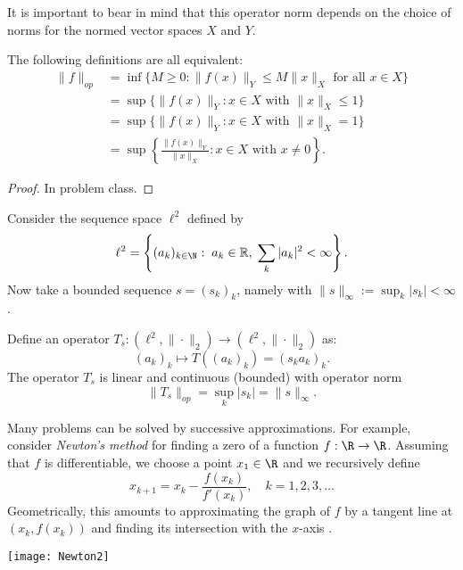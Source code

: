 \begin{remark}
 It is important to bear in mind that this operator norm depends on the choice of norms for the normed vector spaces $X$ and $Y$.
\end{remark}

\begin{proposition}
The following definitions are all equivalent:
$$
{\begin{aligned}\|f\|_{{op}}&=\inf\{M\geq 0:\|f(x)\|_Y\leq M\|x\|_X{\mbox{ for all }}x\in X\}\\
&=\sup\{\|f(x)\|_Y: x\in X{\textrm{ with }}\|x\|_X\leq 1\}\\
&=\sup\{\|f(x)\|_Y: x\in X{\mbox{ with }}\|x\|_X=1\}\\
&=\sup \left\{{\frac  {\|f(x)\|_Y}{\|x\|_X}}: x\in X{\mbox{ with }}x\neq 0\right\}.
\end{aligned}}
$$
\end{proposition}
\begin{proof} In problem class.
\end{proof}
\np

\begin{example}
Consider the sequence space $\ell^2$ defined by
$$
\ell^2 = \left\{ (a_k)_{k \in \N}: \; a_k \in \mathbb{R}, \; \sum_k |a_k|^2 < \infty \right\}.
$$
Now take a bounded sequence $s = (s_k)_k$, namely with $\|s\|_\infty:=\sup _k |s_k|<\infty$. 

Define an operator $T_s: (\ell^2,\|\cdot\|_2) \to (\ell^2, \|\cdot\|_2)$ as:
$$
(a_k)_k \mapsto T((a_k)_k) = (s_k a_k)_k.
$$
The operator $T_s$ is linear and continuous (bounded) with operator norm
$$
\| T_s\|_{op} = \sup_k|s_k| =\| s \|_{\infty}.
$$
\end{example}





Many problems can be solved by successive approximations. For example,
consider \emph{Newton's method} for finding a zero of a function $f : \R \to \R$.
Assuming that $f$ is differentiable, we choose a point $x_1 \in \R$ and we
recursively define
\[
x_{k + 1} = x_k - \frac{f(x_k)}{f'(x_k)}, \quad k = 1,2,3,\ldots
\]
Geometrically, this amounts to approximating the graph of $f$ by
a tangent line at $(x_k,f(x_k))$ and finding its intersection with
the $x$-axis%
.

\iffalse\boxdiag4\else
\begin{center}
\texttt{[image: Newton2]}
\end{center}
\fi

